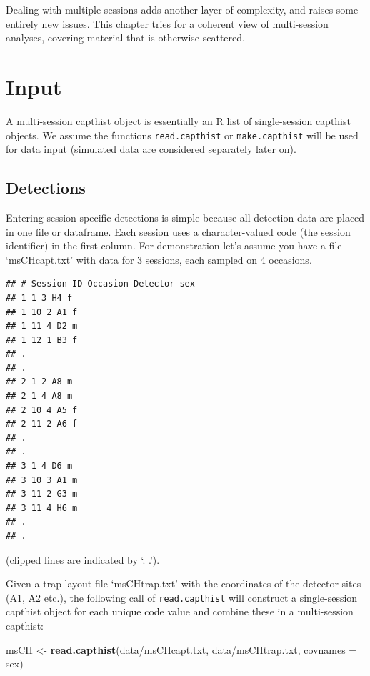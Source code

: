\documentclass[
]{book}
\newenvironment{Shaded}{\begin{snugshade}}{\end{snugshade}}
\newcommand{\AttributeTok}[1]{\textcolor[rgb]{0.13,0.29,0.53}{#1}}
\newcommand{\FunctionTok}[1]{\textcolor[rgb]{0.13,0.29,0.53}{\textbf{#1}}}
\newcommand{\NormalTok}[1]{#1}
\newcommand{\OtherTok}[1]{\textcolor[rgb]{0.56,0.35,0.01}{#1}}
\newcommand{\StringTok}[1]{\textcolor[rgb]{0.31,0.60,0.02}{#1}}
\begin{document}
Dealing with multiple sessions adds another layer of complexity, and raises some entirely new issues. This chapter tries for a coherent view of multi-session analyses, covering material that is otherwise scattered.

\section{Input}\label{input-1}

A multi-session capthist object is essentially an R list of single-session capthist objects. We assume the functions \texttt{read.capthist} or \texttt{make.capthist} will be used for data input (simulated data are considered separately later on).

\subsection{Detections}\label{detections}

Entering session-specific detections is simple because all detection data are placed in one file or dataframe. Each session uses a character-valued code (the session identifier) in the first column. For demonstration let's assume you have a file `msCHcapt.txt' with data for 3 sessions, each sampled on 4 occasions.

\begin{verbatim}
## # Session ID Occasion Detector sex 
## 1 1 3 H4 f
## 1 10 2 A1 f
## 1 11 4 D2 m
## 1 12 1 B3 f
## .
## .
## 2 1 2 A8 m
## 2 1 4 A8 m
## 2 10 4 A5 f
## 2 11 2 A6 f
## .
## .
## 3 1 4 D6 m
## 3 10 3 A1 m
## 3 11 2 G3 m
## 3 11 4 H6 m
## .
## .
\end{verbatim}

(clipped lines are indicated by `. .').

Given a trap layout file `msCHtrap.txt' with the coordinates of the detector sites (A1, A2 etc.), the following call of \texttt{read.capthist} will construct a single-session capthist object for each unique code value and combine these in a multi-session capthist:

\begin{Shaded}
\begin{Highlighting}[]
\NormalTok{msCH }\OtherTok{\textless{}{-}} \FunctionTok{read.capthist}\NormalTok{(}\StringTok{\textquotesingle{}data/msCHcapt.txt\textquotesingle{}}\NormalTok{, }\StringTok{\textquotesingle{}data/msCHtrap.txt\textquotesingle{}}\NormalTok{, }\AttributeTok{covnames =} \StringTok{\textquotesingle{}sex\textquotesingle{}}\NormalTok{)}
\end{Highlighting}
\end{Shaded}
\end{document}
